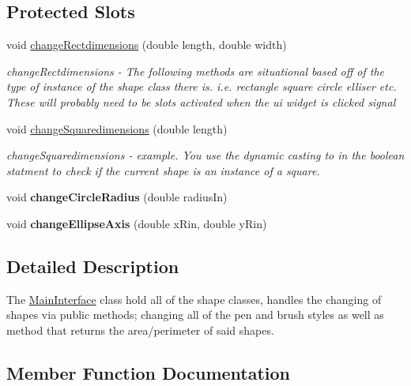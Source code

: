 \subsection*{Protected Slots}
\begin{DoxyCompactItemize}
\item 
void \hyperlink{class_main_interface_a30d5b73b6b048b5ef9a1095db3a9df23}{change\+Rectdimensions} (double length, double width)
\begin{DoxyCompactList}\small\item\em change\+Rectdimensions -\/ The following methods are situational based off of the type of instance of the shape class there is. i.\+e. rectangle square circle elliser etc. These will probably need to be slots activated when the ui widget is clicked signal \end{DoxyCompactList}\item 
void \hyperlink{class_main_interface_a0331ae438758b87a4658a227d35e39dc}{change\+Squaredimensions} (double length)
\begin{DoxyCompactList}\small\item\em change\+Squaredimensions -\/ example. You use the dynamic casting to in the boolean statment to check if the current shape is an instance of a square. \end{DoxyCompactList}\item 
\mbox{\label{class_main_interface_ab9802c99985d57469a9124ae925af8e5}} 
void {\bfseries change\+Circle\+Radius} (double radius\+In)
\item 
\mbox{\label{class_main_interface_af4007d63c3726dce8e968f7d6472fecf}} 
void {\bfseries change\+Ellipse\+Axis} (double x\+Rin, double y\+Rin)
\end{DoxyCompactItemize}


\subsection{Detailed Description}
The \hyperlink{class_main_interface}{Main\+Interface} class hold all of the shape classes, handles the changing of shapes via public methods; changing all of the pen and brush styles as well as method that returns the area/perimeter of said shapes. 

\subsection{Member Function Documentation}
\mbox{\label{class_main_interface_a30d5b73b6b048b5ef9a1095db3a9df23}} 
